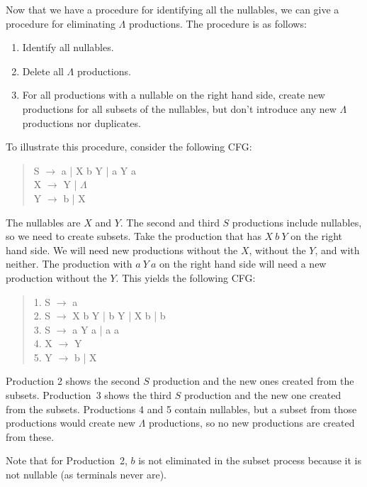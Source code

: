 \documentclass[letterpaper,12pt,openany,reqno]{book}%
\begin{document}
Now that we have a procedure for identifying all the nullables, we can give a procedure for eliminating $\Lambda$ productions. The procedure is as follows:
\begin{enumerate}
\item Identify all nullables.
\item Delete all $\Lambda$ productions.
\item For all productions with a nullable on the right hand side, create new productions for all subsets of the nullables, but don't introduce any new $\Lambda$ productions nor duplicates.
\end{enumerate}
To illustrate this procedure, consider the following CFG:
\begin{quote}
{\ttfamily S} $\rightarrow$ {\ttfamily a | X b Y | a Y a}\\
{\ttfamily X} $\rightarrow$ {\ttfamily Y | $\Lambda$}\\
{\ttfamily Y} $\rightarrow$ {\ttfamily b | X}\\
\end{quote}
The nullables are $X$ and $Y$. The second and third $S$ productions include nullables, so we need to create subsets. Take the production that has $X\ b\ Y$ on the right hand side. We will need new productions without the $X$, without the $Y$, and with neither. The production with $a\ Y\ a$ on the right hand side will need a new production without the $Y$. This yields the following CFG:
\begin{quote}
{1. \ttfamily S} $\rightarrow$ {\ttfamily a}\\
{2. \ttfamily S} $\rightarrow$ {\ttfamily X b Y | b Y | X b | b}\\
{3. \ttfamily S} $\rightarrow$ {\ttfamily a Y a | a a}\\
{4. \ttfamily X} $\rightarrow$ {\ttfamily Y}\\
{5. \ttfamily Y} $\rightarrow$ {\ttfamily b | X}\\
\end{quote}
Production 2 shows the second $S$ production and the new ones created from the subsets. Production~3 shows the third $S$ production and the new one created from the subsets. Productions 4 and 5 contain nullables, but a subset from those productions would create new $\Lambda$ productions, so no new productions are created from these.

Note that for Production~2, $b$ is not eliminated in the subset process because it is not nullable (as terminals never are).
\end{document}
